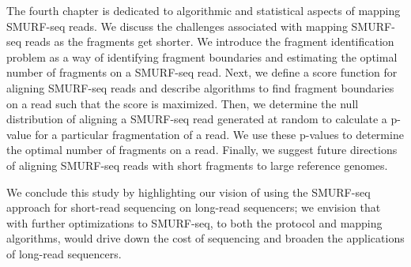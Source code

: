 The fourth chapter is dedicated to algorithmic and statistical aspects
of mapping SMURF-seq reads. We discuss the challenges associated with
mapping SMURF-seq reads as the fragments get shorter.
%
We introduce the fragment identification problem as a way of identifying
fragment boundaries and estimating the optimal number of fragments on a
SMURF-seq read.
%
Next, we define a score function for aligning SMURF-seq reads and
describe algorithms to find fragment boundaries on a read such that the
score is maximized.
%
Then, we determine the null distribution of aligning a SMURF-seq read
generated at random to calculate a p-value for a particular
fragmentation of a read. We use these p-values to determine the optimal
number of fragments on a read.
%
Finally, we suggest future directions of aligning SMURF-seq reads with
short fragments to large reference genomes.

We conclude this study by highlighting our vision of using the SMURF-seq
approach for short-read sequencing on long-read sequencers; we envision
that with further optimizations to SMURF-seq, to both the protocol and
mapping algorithms, would drive down the cost of sequencing and broaden
the applications of long-read sequencers.
